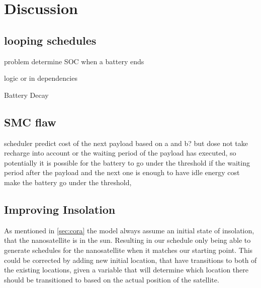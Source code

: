 \section{Discussion} \label{sec:discussion}

\subsection{looping schedules}
problem determine SOC when a battery ends 

logic or in dependencies

Battery Decay

\subsection{SMC flaw}
scheduler predict cost of the next payload based on a and b? but dose not take recharge into account or the waiting period of the payload has executed, so potentially it is possible for the battery to go under the threshold if the waiting period after the payload and the next one is enough to have idle energy cost make the battery go under the threshold,  

\subsection{Improving Insolation}
As mentioned in \cref{sec:cora} the model always assume an initial state of insolation, that the nanosatellite is in the sun. Resulting in our schedule only being able to generate schedules for the nanosatellite when it matches our starting point.
This could be corrected by adding new initial location, that have transitions to both of the existing locations, given a variable that will determine which location there should be transitioned to based on the actual position of the satellite.
